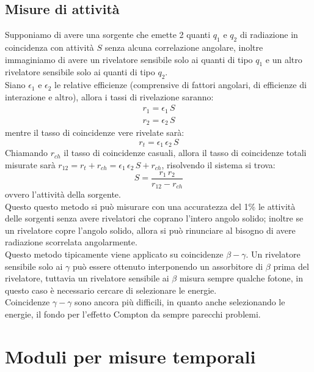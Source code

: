 \subsection{Misure di attivit\`a}
Supponiamo di avere una sorgente che emette 2 quanti $q_1$ e $q_2$ di radiazione in coincidenza con attivit\`a $S$ senza alcuna correlazione angolare, inoltre immaginiamo di avere un rivelatore
sensibile solo ai quanti di tipo $q_1$ e un altro rivelatore sensibile solo ai quanti di tipo $q_2$.\\
Siano $\epsilon_1$ e $\epsilon_2$ le relative efficienze (comprensive di fattori angolari, di efficienze di interazione e altro), allora i tassi di rivelazione saranno:
\begin{gather}
r_1 = \epsilon_1 \, S\\
r_2 = \epsilon_2 \, S
\end{gather}
mentre il tasso di coincidenze vere rivelate sar\`a:
\begin{equation*}
r_{t} = \epsilon_1 \, \epsilon_2 \, S
\end{equation*}
Chiamando $r_{ch}$ il tasso di coincidenze casuali, allora il tasso di coincidenze totali misurate sar\`a
$r_{12} = r_{t} + r_{ch} = \epsilon_1 \, \epsilon_2 \, S + r_{ch} $, risolvendo il sistema si trova:
\begin{equation*}
S = \frac{r_1 \, r_2}{r_{12}-r_{ch}}
\end{equation*}
ovvero l'attivit\`a della sorgente.\\
Questo questo metodo si pu\`o misurare con una accuratezza del 1\% le attivit\`a delle sorgenti senza avere rivelatori che coprano l'intero angolo solido;
inoltre se un rivelatore copre l'angolo solido, allora si pu\`o rinunciare al bisogno di avere radiazione scorrelata angolarmente.\\
Questo metodo tipicamente viene applicato su coincidenze $\beta-\gamma$.
Un rivelatore sensibile solo ai $\gamma$ pu\`o essere ottenuto interponendo un assorbitore di $\beta$ prima del rivelatore, tuttavia un rivelatore
sensibile ai $\beta$ misura sempre qualche fotone, in questo caso \`e necessario cercare di selezionare le energie.\\
Coincidenze $\gamma - \gamma$ sono ancora pi\`u difficili, in quanto anche selezionando le energie, il fondo per l'effetto Compton da sempre parecchi problemi.
\section{Moduli per misure temporali}
